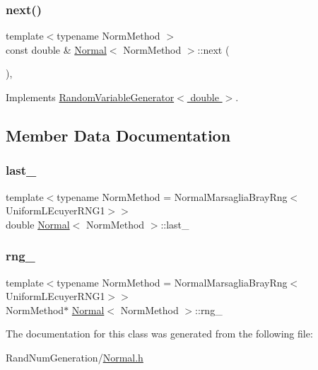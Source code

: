 \subsubsection{\texorpdfstring{next()}{next()}}
{\footnotesize\ttfamily template$<$typename Norm\+Method $>$ \\
const double \& \hyperlink{class_normal}{Normal}$<$ Norm\+Method $>$\+::next (\begin{DoxyParamCaption}{ }\end{DoxyParamCaption})\hspace{0.3cm}{\ttfamily [override]}, {\ttfamily [virtual]}}



Implements \hyperlink{class_random_variable_generator_a5178e1f85eff432dffd6320767136836}{Random\+Variable\+Generator$<$ double $>$}.



\subsection{Member Data Documentation}
\hypertarget{class_normal_a69f8977c8b8224cf6345b1e2d0d35382}{}\label{class_normal_a69f8977c8b8224cf6345b1e2d0d35382} 
\subsubsection{\texorpdfstring{last\+\_\+}{last\_}}
{\footnotesize\ttfamily template$<$typename Norm\+Method  = Normal\+Marsaglia\+Bray\+Rng$<$\+Uniform\+L\+Ecuyer\+R\+N\+G1$>$$>$ \\
double \hyperlink{class_normal}{Normal}$<$ Norm\+Method $>$\+::last\+\_\+\hspace{0.3cm}{\ttfamily [private]}}

\hypertarget{class_normal_a8abdfd7e9bb63b5ee26e1627829e65b0}{}\label{class_normal_a8abdfd7e9bb63b5ee26e1627829e65b0} 
\subsubsection{\texorpdfstring{rng\+\_\+}{rng\_}}
{\footnotesize\ttfamily template$<$typename Norm\+Method  = Normal\+Marsaglia\+Bray\+Rng$<$\+Uniform\+L\+Ecuyer\+R\+N\+G1$>$$>$ \\
Norm\+Method$\ast$ \hyperlink{class_normal}{Normal}$<$ Norm\+Method $>$\+::rng\+\_\+\hspace{0.3cm}{\ttfamily [private]}}



The documentation for this class was generated from the following file\+:\begin{DoxyCompactItemize}
\item 
Rand\+Num\+Generation/\hyperlink{_normal_8h}{Normal.\+h}\end{DoxyCompactItemize}
